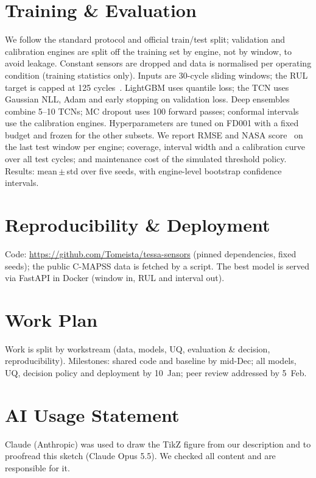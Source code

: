 \documentclass[10pt,twocolumn,a4paper]{article}
\begin{document}
\section{Training \& Evaluation}
We follow the standard protocol and official train/test split; validation and calibration engines are split off
the training set by engine, not by window, to avoid leakage. Constant sensors are dropped and
data is normalised per operating condition (training statistics only). Inputs are 30-cycle sliding
windows; the RUL target is capped at 125 cycles~\cite{LI20181}. LightGBM uses quantile loss; the TCN
uses Gaussian NLL, Adam and early stopping on validation loss. Deep ensembles combine 5--10 TCNs; MC dropout uses 100 forward passes; conformal intervals use the
calibration engines. Hyperparameters are tuned on FD001 with a fixed budget and frozen for the other
subsets. We report RMSE and NASA score~\cite{4711414} on the last test window per engine; coverage,
interval width and a calibration curve over all test cycles; and maintenance cost of the
simulated threshold policy. Results: mean\,$\pm$\,std over five seeds, with engine-level bootstrap
confidence intervals.
\section{Reproducibility \& Deployment}
Code: \url{https://github.com/Tomeista/tessa-sensors} (pinned dependencies, fixed seeds);
the public C-MAPSS data is fetched by a script. The best model is served via FastAPI in Docker
(window in, RUL and interval out).

\section{Work Plan}
Work is split by workstream (data, models, UQ, evaluation \& decision, reproducibility).
Milestones: shared code and baseline by mid-Dec; all models, UQ, decision policy and
deployment by 10~Jan; peer review addressed by 5~Feb.

\section{AI Usage Statement}
Claude (Anthropic) was used to draw the TikZ figure from our description and to proofread
this sketch (Claude Opus 5.5). We checked all content
and are responsible for it.
  {\small
    
    
  }
\end{document}
